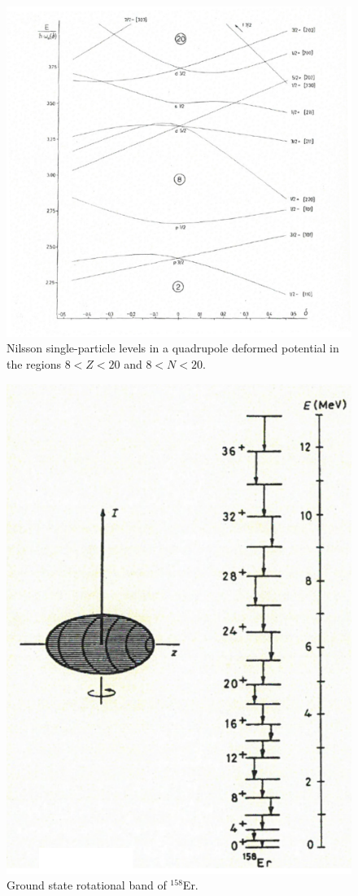 \begin{figure}
	\centerline {
		\includegraphics*[width=15cm, angle=0.]{introduccion/figs/fig0_4_2_v4}
	}
	\caption{Nilsson single-particle levels in a quadrupole deformed potential in the regions $8<Z<20$ and $8<N<20$.}
	\label{fig0.4.1}
\end{figure}
\begin{figure}
	\centerline {
		\includegraphics*[width=12cm, angle=0.]{introduccion/figs/fig0_4_2_v3}
	}
	\caption{Ground state rotational band of $^{158}$Er.}
	\label{fig0.4.2}
\end{figure}
